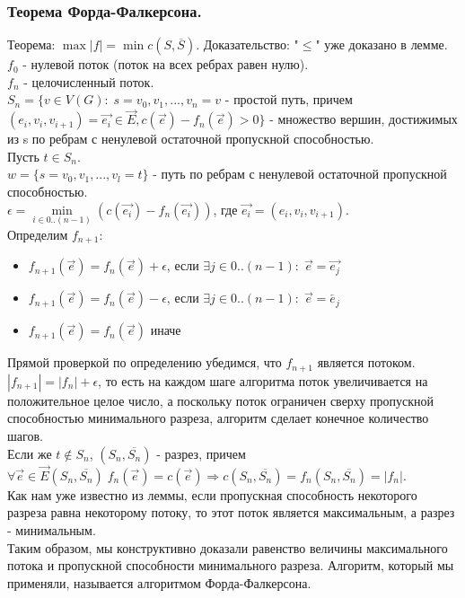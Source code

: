\subsubsection{Теорема Форда-Фалкерсона.}
Теорема: $\max |f| = \min c(S, \overline{S})$.
Доказательство: "$\leq$" уже доказано в лемме.\\
$f_0$ - нулевой поток (поток на всех ребрах равен нулю).\\
$f_n$ - целочисленный поток.\\
$S_n = \{v \in V(G): \; s = v_0,v_1,...,v_n = v$ - простой путь, причем $(e_i, v_i, v_{i + 1}) = \overrightarrow{e_i} \in \overrightarrow{E}, c(\overrightarrow{e}) - f_n(\overrightarrow{e}) > 0 \}$ - множество вершин, достижимых из s по ребрам с ненулевой остаточной пропускной способностью.\\
Пусть $t \in S_n$.\\
$w = \{s = v_0, v_1, ... , v_l = t\}$ - путь по ребрам с ненулевой остаточной пропускной способностью.\\
$\epsilon = \min\limits_{i \in 0..(n - 1)} (c(\overrightarrow{e_i}) - f_n(\overrightarrow{e_i}))$, где $\overrightarrow{e_i} = (e_i, v_i, v_{i + 1})$.\\
Определим $f_{n + 1}$:\\
\begin{itemize}
\item $f_{n + 1}(\overrightarrow{e}) = f_{n}(\overrightarrow{e}) + \epsilon$, если $\exists j \in 0..(n - 1): \; \overrightarrow{e} = \overrightarrow{e_j}$\\
\item $f_{n + 1}(\overrightarrow{e}) = f_{n}(\overrightarrow{e}) - \epsilon$, если $\exists j \in 0..(n - 1): \; \overrightarrow{e} = \overleftarrow{e_j}$\\
\item $f_{n + 1}(\overrightarrow{e}) = f_{n}(\overrightarrow{e})$ иначе
\end{itemize}
Прямой проверкой по определению убедимся, что $f_{n + 1}$ является потоком.\\
$|f_{n + 1}| = |f_n| + \epsilon$, то есть на каждом шаге алгоритма поток увеличивается на положительное целое число, а поскольку поток ограничен сверху пропускной способностью минимального разреза, алгоритм сделает конечное количество шагов.\\
Если же $t \not\in S_n$, $(S_n, \overline{S_n})$ - разрез, причем $\forall \overrightarrow{e} \in \overrightarrow{E}(S_n, \overline{S_n}) \; f_n(\overrightarrow{e}) = c(\overrightarrow{e}) \Rightarrow c(S_n, \overline{S_n}) = f_n(S_n, \overline{S_n}) = |f_n|$.\\
Как нам уже известно из леммы, если пропускная способность некоторого разреза равна некоторому потоку, то этот поток является максимальным, а разрез - минимальным.\\
Таким образом, мы конструктивно доказали равенство величины максимального потока и пропускной способности минимального разреза. Алгоритм, который мы применяли, называется алгоритмом Форда-Фалкерсона.
